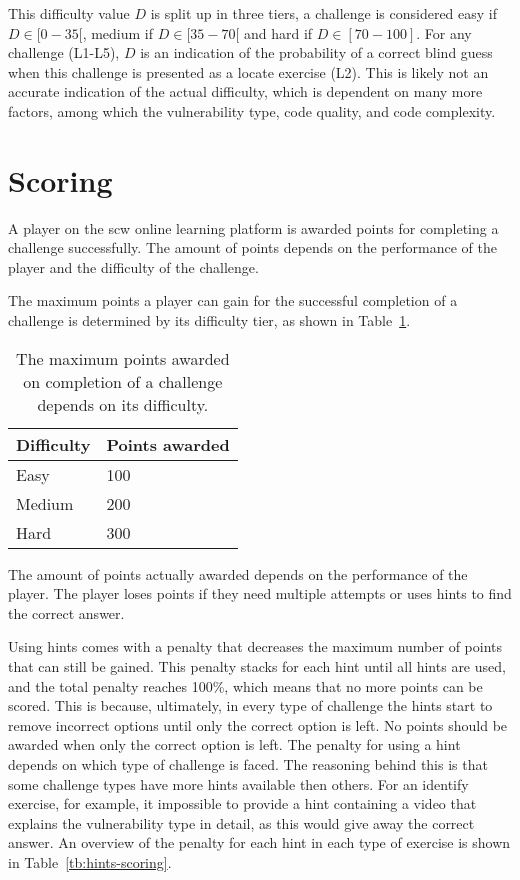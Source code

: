 This difficulty value $D$ is split up in three tiers, a challenge is considered easy if $D \in [0-35[$, medium if $D \in [35-70[$ and hard if $D \in [70-100]$. For any challenge (L1-L5), $D$ is an indication of the probability of a correct blind guess when this challenge is presented as a locate exercise (L2). This is likely not an accurate indication of the actual difficulty, which is dependent on many more factors, among which the vulnerability type, code quality, and code complexity.

\section{Scoring}
\label{sec:scoring}
A player on the \gls{scw} online learning platform is awarded points for completing a challenge successfully. 
The amount of points depends on the performance of the player and the difficulty of the challenge.

The maximum points a player can gain for the successful completion of a challenge is determined by its difficulty tier, as shown in Table~\ref{tb:points}.

\begin{table}
\centering
\caption[Points awarded for each difficulty on the SCW platform]{The maximum points awarded on completion of a challenge depends on its difficulty.}
\begin{tabular}{ll} 
 Difficulty &  Points awarded\\
 \hline
 Easy & 100\\
 Medium & 200\\
 Hard & 300\\
\end{tabular}

\label{tb:points}
\end{table}

The amount of points actually awarded depends on the performance of the player. The player loses points if they need multiple attempts or uses hints to find the correct answer.

Using hints comes with a penalty that decreases the maximum number of points that can still be gained. This penalty stacks for each hint until all hints are used, and the total penalty reaches 100\%, which means that no more points can be scored. 
This is because, ultimately, in every type of challenge the hints start to remove incorrect options until only the correct option is left. 
No points should be awarded when only the correct option is left.
The penalty for using a hint depends on which type of challenge is faced.
The reasoning behind this is that some challenge types have more hints available then others. 
For an identify exercise, for example, it impossible to provide a hint containing a video that explains the vulnerability type in detail, as this would give away the correct answer.
An overview of the penalty for each hint in each type of exercise is shown in Table~\ref{tb:hints-scoring}.

